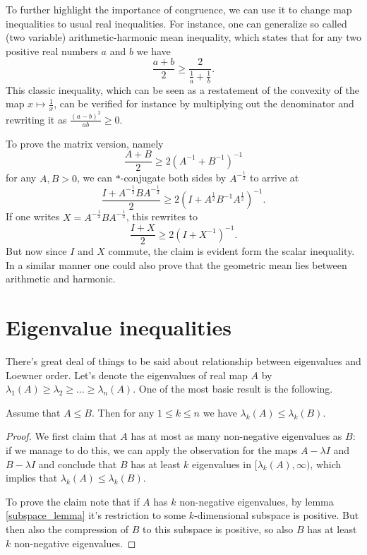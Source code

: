 To further highlight the importance of congruence, we can use it to change map inequalities to usual real inequalities. For instance, one can generalize so called (two variable) arithmetic-harmonic mean inequality, which states that for any two positive real numbers $a$ and $b$ we have
\[
	\frac{a + b}{2} \geq \frac{2}{\frac{1}{a} + \frac{1}{b}}.
\]
This classic inequality, which can be seen as a restatement of the convexity of the map $x \mapsto \frac{1}{x}$, can be verified for instance by multiplying out the denominator and rewriting it as $\frac{(a - b)^{2}}{ab} \geq 0$.

To prove the matrix version, namely
\[
	\frac{A + B}{2} \geq 2 (A^{-1} + B^{-1})^{-1}
\]
for any $A, B > 0$, we can $*$-conjugate both sides by $A^{-\frac{1}{2}}$ to arrive at
\[
	\frac{I + A^{-\frac{1}{2}}B A^{-\frac{1}{2}}}{2} \geq 2 (I + A^{\frac{1}{2}}B^{-1} A^{\frac{1}{2}})^{-1}.
\]
If one writes $X = A^{-\frac{1}{2}}B A^{-\frac{1}{2}}$, this rewrites to
\[
	\frac{I + X}{2} \geq 2 (I + X^{-1})^{-1}.
\]
But now since $I$ and $X$ commute, the claim is evident form the scalar inequality. In a similar manner one could also prove that the geometric mean lies between arithmetic and harmonic.

\section{Eigenvalue inequalities}

There's great deal of things to be said about relationship between eigenvalues and Loewner order. Let's denote the eigenvalues of real map $A$ by $\lambda_{1}(A) \geq \lambda_{2} \geq \ldots \geq \lambda_{n}(A)$. One of the most basic result is the following.

\begin{prop}\label{loewner_eigenvalues}
	Assume that $A \leq B$. Then for any $1 \leq k \leq n$ we have $\lambda_{k}(A) \leq \lambda_{k}(B)$.
\end{prop}
\begin{proof}
	We first claim that $A$ has at most as many non-negative eigenvalues as $B$: if we manage to do this, we can apply the observation for the maps $A - \lambda I$ and $B - \lambda I$ and conclude that $B$ has at least $k$ eigenvalues in $[\lambda_{k}(A), \infty)$, which implies that $\lambda_{k}(A) \leq \lambda_{k}(B)$.

	To prove the claim note that if $A$ has $k$ non-negative eigenvalues, by lemma \ref{subspace_lemma} it's restriction to some $k$-dimensional subspace is positive. But then also the compression of $B$ to this subspace is positive, so also $B$ has at least $k$ non-negative eigenvalues.
\end{proof}

